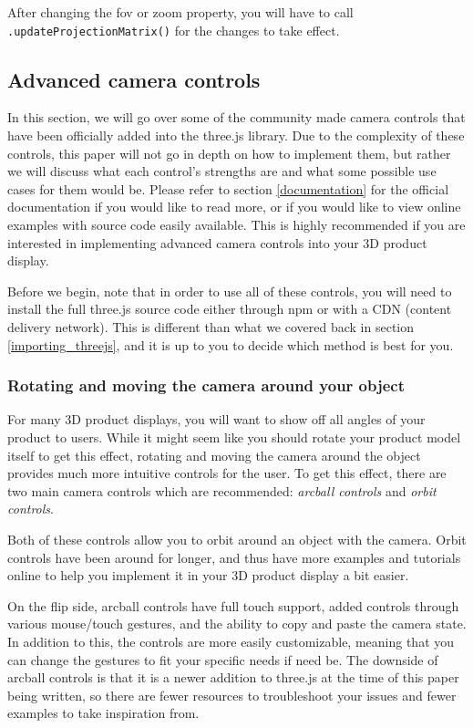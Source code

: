 \documentclass[10pt,final,journal,compsoc]{IEEEtran}
\begin{document}
    After changing the fov or zoom property, you will have to call \verb|.updateProjectionMatrix()| for the changes to take effect.
        
    \subsection{Advanced camera controls} \label{camera_controls}
    In this section, we will go over some of the community made camera controls that have been officially added into the three.js library. Due to the complexity of these controls, this paper will not go in depth on how to implement them, but rather we will discuss what each control's strengths are and what some possible use cases for them would be. Please refer to section \ref{documentation} for the official documentation if you would like to read more, or if you would like to view online examples with source code easily available. This is highly recommended if you are interested in implementing advanced camera controls into your 3D product display.
    
    Before we begin, note that in order to use all of these controls, you will need to install the full three.js source code either through npm or with a CDN (content delivery network). This is different than what we covered back in section \ref{importing_threejs}, and it is up to you to decide which method is best for you.
        
        \subsubsection{Rotating and moving the camera around your object}
        For many 3D product displays, you will want to show off all angles of your product to users. While it might seem like you should rotate your product model itself to get this effect, rotating and moving the camera around the object provides much more intuitive controls for the user. To get this effect, there are two main camera controls which are recommended: \textit{arcball controls} and \textit{orbit controls}.
        
        Both of these controls allow you to orbit around an object with the camera. Orbit controls have been around for longer, and thus have more examples and tutorials online to help you implement it in your 3D product display a bit easier.
        
        On the flip side, arcball controls have full touch support, added controls through various mouse/touch gestures, and the ability to copy and paste the camera state. In addition to this, the controls are more easily customizable, meaning that you can change the gestures to fit your specific needs if need be. The downside of arcball controls is that it is a newer addition to three.js at the time of this paper being written, so there are fewer resources to troubleshoot your issues and fewer examples to take inspiration from.
        
\end{document}
